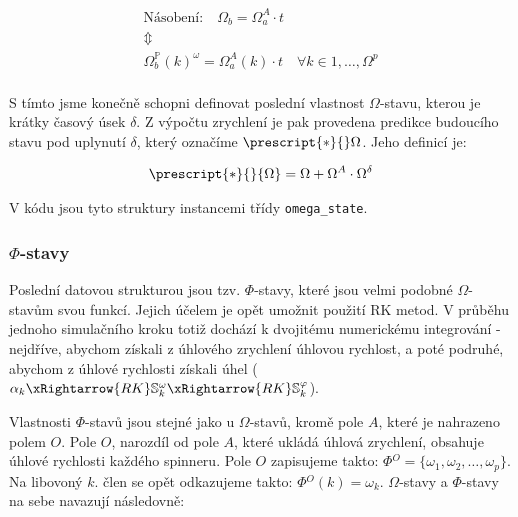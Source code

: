 \begin{equation}
    \label{eq:sim_equations_formalized4}
    \begin{gathered}
        \text{Násobení:}\quad
        \Omega_{b} = \Omega_{a}^A \cdot t \quad \quad \\
        \Updownarrow \\
        \Omega_{b}^{\mathbb{P}}(k)^{\omega} = \Omega_{a}^{A}(k) \cdot t
        \quad \forall k \in {1, \ldots, \Omega^{p}} \\
    \end{gathered}
\end{equation}

S tímto jsme konečně schopni definovat poslední vlastnost $\Omega$-stavu, kterou je krátky časový úsek $\delta$.
Z výpočtu zrychlení je pak provedena predikce budoucího stavu pod uplynutí $\delta$, který označíme $\prescript{*}{}\Omega$.
Jeho definicí je:

\begin{equation}
    \label{eq:sim_equations_formalized5}
    \begin{gathered}
        \prescript{*}{}{\Omega} = \Omega + \Omega^A \cdot \Omega^{\delta}
    \end{gathered}
\end{equation}

V kódu jsou tyto struktury instancemi třídy \texttt{omega\_state}.

\clearpage

\subsubsection{$\Phi$-stavy}

Poslední datovou strukturou jsou tzv. $\Phi$-stavy, které jsou velmi podobné $\Omega$-stavům svou funkcí. Jejich účelem je opět umožnit použití RK metod. V průběhu jednoho simulačního kroku totiž dochází k dvojitému numerickému integrování - nejdříve, abychom získali z úhlového zrychlení úhlovou rychlost, a poté podruhé, abychom z úhlové rychlosti získali úhel
($\alpha_k \xRightarrow{RK} \mathbb{S}_k^{\omega}  \xRightarrow{RK} \mathbb{S}_k^{\varphi}$).

Vlastnosti $\Phi$-stavů jsou stejné jako u $\Omega$-stavů, kromě pole $A$, které je nahrazeno polem $O$. Pole $O$, narozdíl od pole $A$, které ukládá úhlová zrychlení, obsahuje úhlové rychlosti každého spinneru. Pole $O$ zapisujeme takto: $\Phi{}^{O} = \{ \omega_1, \omega_2, \ldots, \omega_p\}$. Na libovoný $k$. člen se opět odkazujeme takto: $\Phi{}^{O}(k) = \omega_k$. $\Omega$-stavy a $\Phi$-stavy na sebe navazují následovně:

